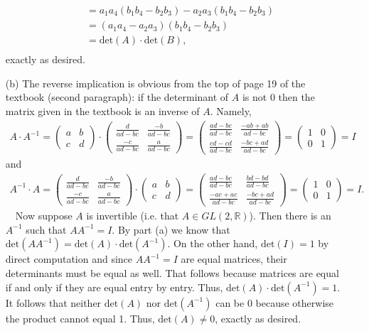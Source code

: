 \documentclass[12pt]{article}
\def\R{{\mathbb R}}        %
\numberwithin{theorem}{section}
\numberwithin{equation}{section}
\numberwithin{remark}{section}
\numberwithin{definition}{section}
\numberwithin{theorem}{section}
\numberwithin{lemma}{section}
\numberwithin{example}{section}
\begin{document}
\begin{itemize}
{\begin{align*}
			& = a_1a_4(b_1b_4-b_2b_3)-a_2a_3(b_1b_4-b_2b_3)\\
			& = (a_1a_4-a_2a_3)(b_1b_4-b_2b_3)\\
			& = \text{det}(A)\cdot\text{det}(B),\\
		\end{align*}
	exactly as desired.}
	\item[(b)]{The reverse implication is obvious from the top of page 19 of the textbook (second paragraph): if the determinant of $A$ is not $0$ then the matrix given in the textbook is an inverse of $A$. Namely,
	\begin{align*}
		A\cdot A^{-1} = \begin{pmatrix}a & b \\ c & d \end{pmatrix} \cdot \begin{pmatrix}\frac{d}{ad-bc} & \frac{-b}{ad-bc} \\ \frac{-c}{ad-bc} & \frac{a}{ad-bc} \end{pmatrix} = \begin{pmatrix}\frac{ad-bc}{ad-bc} &  \frac{-ab+ab}{ad-bc}\\ \frac{cd-cd}{ad-bc} & \frac{-bc+ad}{ad-bc} \end{pmatrix} = \begin{pmatrix}1 &  0 \\ 0 & 1 \end{pmatrix} = I
	\end{align*}
	and
	\begin{align*}
		A^{-1}\cdot A = \begin{pmatrix}\frac{d}{ad-bc} & \frac{-b}{ad-bc} \\ \frac{-c}{ad-bc} & \frac{a}{ad-bc} \end{pmatrix} \cdot \begin{pmatrix}a & b \\ c & d \end{pmatrix} = \begin{pmatrix}\frac{ad-bc}{ad-bc} &  \frac{bd-bd}{ad-bc}\\ \frac{-ac+ac}{ad-bc} & \frac{-bc+ad}{ad-bc} \end{pmatrix} = \begin{pmatrix}1 &  0 \\ 0 & 1 \end{pmatrix} = I.
	\end{align*}
	\,\,\,\, Now suppose $A$ is invertible (i.e. that $A\in GL(2,\R)$). Then there is an $A^{-1}$ such that $AA^{-1}=I$. By part (a) we know that $\text{det}(AA^{-1})=\text{det}(A)\cdot\text{det}(A^{-1})$. On the other hand, $\text{det}(I)=1$ by direct computation and since $AA^{-1}=I$ are equal matrices, their determinants must be equal as well. That follows because matrices are equal if and only if they are equal entry by entry. Thus, $\text{det}(A)\cdot\text{det}(A^{-1})=1$. It follows that neither $\text{det}(A)$ nor $\text{det}(A^{-1})$ can be 0 because otherwise the product cannot equal 1. Thus, $\text{det}(A)\neq0$, exactly as desired.}

\end{itemize}
\end{document}
